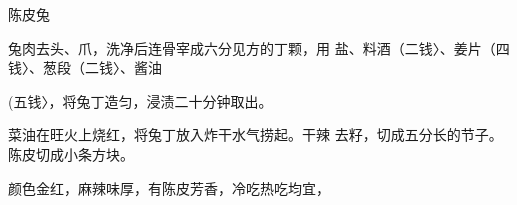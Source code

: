 \begin{recipe}{陈皮兔}

\ingredients


\cooking

\step 	兔肉去头、爪，洗净后连骨宰成六分见方的丁颗，用 盐、料酒（二钱〉、姜片（四钱〉、葱段（二钱〉、酱油

(五钱〉，将兔丁造匀，浸渍二十分钟取出。

\step 	菜油在旺火上烧红，将兔丁放入炸干水气捞起。干辣 去籽，切成五分长的节子。陈皮切成小条方块。

\notes

颜色金红，麻辣味厚，有陈皮芳香，冷吃热吃均宜，

\end{recipe}

